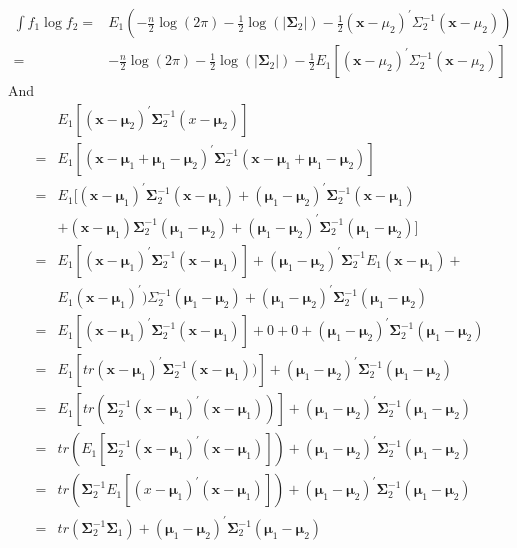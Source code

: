 \documentclass[11pt]{article}
\begin{document}
$$\begin{aligned}
\int f_1 \log f_2 =  & E_1(-\frac{n}{2} \log(2\pi) - \frac{1}{2}\log(| \bm \Sigma_2 |)  -\frac{1}{2}(\bm x - \mu_2)^\prime \Sigma_2^{-1} (\bm x - \mu_2) )\\
= & -\frac{n}{2} \log(2\pi) - \frac{1}{2}\log(| \bm \Sigma_2 |) - \frac{1}{2} E_1 [(\bm x - \mu_2)^\prime \Sigma_2^{-1} (\bm x - \mu_2)]
\end{aligned}$$
And
$$\begin{aligned} 
& E_1[(\bm x - \bm \mu_2)^{\prime} \bm \Sigma_2^{-1}(x - \bm \mu_2)] \\
= & E_1[(\bm x - \bm \mu_1 + \bm \mu_1 - \bm \mu_2)^{\prime} \bm \Sigma_2^{-1}(\bm x - \bm \mu_1 + \bm \mu_1 - \bm \mu_2)] \\
=& E_1[(\bm x - \bm \mu_1)^{\prime} \bm \Sigma_2^{-1}(\bm x - \bm \mu_1) + (\bm \mu_1 - \bm \mu_2)^{\prime} \bm \Sigma_2^{-1}(\bm x - \bm \mu_1) \\
       & + (\bm x - \bm \mu_1) \bm \Sigma_2^{-1} ( \bm \mu_1 -\bm \mu_2) + (\bm \mu_1 -\bm \mu_2)^{\prime}\bm \Sigma_2^{-1}(\bm \mu_1 - \bm \mu_2)] \\
=& E_1[(\bm x - \bm \mu_1)^{\prime}\bm \Sigma_2^{-1}(\bm x - \bm \mu_1)] + (\bm \mu_1 -\bm \mu_2)^{\prime}\bm \Sigma_2^{-1}E_1(\bm x - \bm \mu_1) + \\
       & E_1(\bm x - \bm \mu_1)^{\prime})\Sigma_2^{-1} (\bm \mu_1 -\bm \mu_2) +  (\bm \mu_1 -\bm \mu_2)^{\prime}\bm \Sigma_2^{-1}(\bm \mu_1 -\bm \mu_2)\\
=&E_1[(\bm x - \bm \mu_1)^{\prime}\bm \Sigma_2^{-1}(\bm x - \bm \mu_1)]  + 0 + 0 +  (\bm \mu_1 - \bm \mu_2)^{\prime}\bm \Sigma_2^{-1}(\bm \mu_1 - \bm \mu_2) \\
       =&  E_1[tr(\bm x - \bm \mu_1)^{\prime}\bm \Sigma_2^{-1}(\bm x - \bm \mu_1))] + (\bm \mu_1 - \bm \mu_2)^{\prime}\bm \Sigma_2^{-1}(\bm \mu_1 - \bm \mu_2)  \\
=& E_1[tr(\bm \Sigma_2^{-1}(\bm x - \bm \mu_1)^{\prime}(\bm x - \bm \mu_1))] + (\bm \mu_1 - \bm \mu_2)^{\prime}\bm \Sigma_2^{-1}(\bm \mu_1 - \bm \mu_2) \\
       =& tr(E_1[\bm \Sigma_2^{-1}(\bm x - \bm \mu_1)^{\prime}(\bm x - \bm \mu_1)]) + (\bm \mu_1 - \bm \mu_2)^{\prime}\bm \Sigma_2^{-1}(\bm \mu_1 - \bm \mu_2) \\
=& tr(\bm \Sigma_2^{-1} E_1[(x - \bm \mu_1)^{\prime}(\bm x - \bm \mu_1)]) + (\bm \mu_1 - \bm \mu_2)^{\prime}\bm \Sigma_2^{-1}(\bm \mu_1 - \bm \mu_2) \\
       =& tr(\bm \Sigma_2^{-1} \bm \Sigma_1) + (\bm \mu_1 - \bm \mu_2)^{\prime}\bm \Sigma_2^{-1}(\bm \mu_1 - \bm \mu_2) 
\end{aligned}$$
\end{document}
